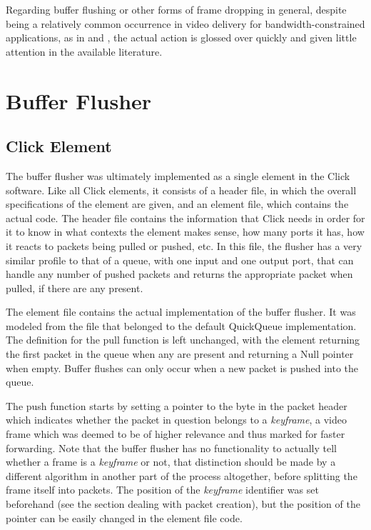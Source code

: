 Regarding buffer flushing or other forms of frame dropping in general, despite being a relatively common occurrence in video delivery for bandwidth-constrained applications, as in \cite{Liu2004} and \cite{Zhang1999}, the actual action is glossed over quickly and given little attention in the available literature.

\chapter{Buffer Flusher}
\section{Click Element}

The buffer flusher was ultimately implemented as a single element in the Click software. Like all Click elements, it consists of a header file, in which the overall specifications of the element are given, and an element file, which contains the actual code. The header file contains the information that Click needs in order for it to know in what contexts the element makes sense, how many ports it has, how it reacts to packets being pulled or pushed, etc. In this file, the flusher has a very similar profile to that of a queue, with one input and one output port, that can handle any number of pushed packets and returns the appropriate packet when pulled, if there are any present. 

The element file contains the actual implementation of the buffer flusher. It was modeled from the file that belonged to the default QuickQueue implementation. The definition for the pull function is left unchanged, with the element returning the first packet in the queue when any are present and returning a Null pointer when empty. Buffer flushes can only occur when a new packet is pushed into the queue.

The push function starts by setting a pointer to the byte in the packet header which indicates whether the packet in question belongs to a \textit{keyframe}, a video frame which was deemed to be of higher relevance and thus marked for faster forwarding. Note that the buffer flusher has no functionality to actually tell whether a frame is a \textit{keyframe} or not, that distinction should be made by a different algorithm in another part of the process altogether, before splitting the frame itself into packets. The position of the \textit{keyframe} identifier was set beforehand (see the section dealing with packet creation), but the position of the pointer can be easily changed in the element file code. 

